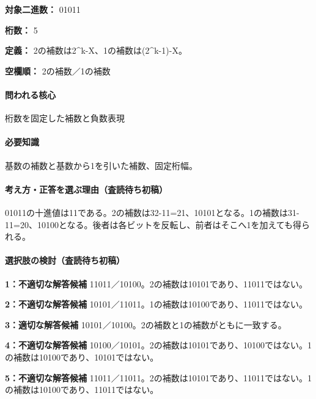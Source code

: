 \noindent\textbf{対象二進数：} 01011\par

\noindent\textbf{桁数：} 5\par

\noindent\textbf{定義：} 2の補数は2\textasciicircum{}k-X、1の補数は(2\textasciicircum{}k-1)-X。\par

\noindent\textbf{空欄順：} 2の補数／1の補数\par

\paragraph{問われる核心} 桁数を固定した補数と負数表現

\paragraph{必要知識} 基数の補数と基数から1を引いた補数、固定桁幅。

\paragraph{考え方・正答を選ぶ理由（査読待ち初稿）} 01011の十進値は11である。2の補数は32-11=\allowbreak{}21、10101となる。1の補数は31-11=\allowbreak{}20、10100となる。後者は各ビットを反転し、前者はそこへ1を加えても得られる。

\paragraph{選択肢の検討（査読待ち初稿）}\mbox{}\par

\noindent\textbf{1：不適切な解答候補} 11011／10100。2の補数は10101であり、11011ではない。\par

\noindent\textbf{2：不適切な解答候補} 10101／11011。1の補数は10100であり、11011ではない。\par

\noindent\textbf{3：適切な解答候補} 10101／10100。2の補数と1の補数がともに一致する。\par

\noindent\textbf{4：不適切な解答候補} 10100／10101。2の補数は10101であり、10100ではない。1の補数は10100であり、10101ではない。\par

\noindent\textbf{5：不適切な解答候補} 11011／11011。2の補数は10101であり、11011ではない。1の補数は10100であり、11011ではない。\par

